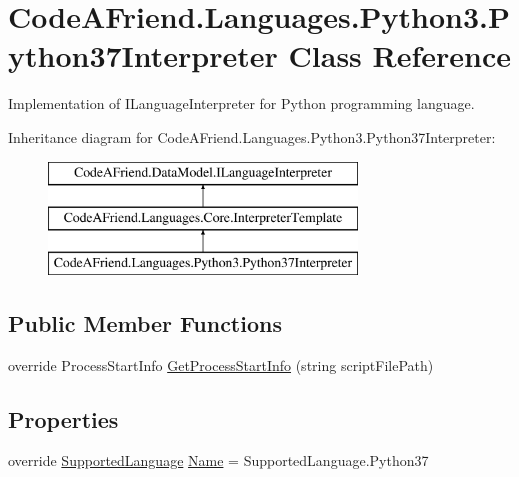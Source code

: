 \hypertarget{class_code_a_friend_1_1_languages_1_1_python3_1_1_python37_interpreter}{}\section{Code\+A\+Friend.\+Languages.\+Python3.\+Python37\+Interpreter Class Reference}
\label{class_code_a_friend_1_1_languages_1_1_python3_1_1_python37_interpreter}


Implementation of I\+Language\+Interpreter for Python programming language.  


Inheritance diagram for Code\+A\+Friend.\+Languages.\+Python3.\+Python37\+Interpreter\+:\begin{figure}[H]
\begin{center}
\leavevmode
\includegraphics[height=3.000000cm]{class_code_a_friend_1_1_languages_1_1_python3_1_1_python37_interpreter}
\end{center}
\end{figure}
\subsection*{Public Member Functions}
\begin{DoxyCompactItemize}
\item 
override Process\+Start\+Info \mbox{\hyperlink{class_code_a_friend_1_1_languages_1_1_python3_1_1_python37_interpreter_a61f777c41849f97cd94eccee5fe7c617}{Get\+Process\+Start\+Info}} (string script\+File\+Path)
\end{DoxyCompactItemize}
\subsection*{Properties}
\begin{DoxyCompactItemize}
\item 
override \mbox{\hyperlink{namespace_code_a_friend_1_1_data_model_a13e088c525db1b03a4de75420ced79b2}{Supported\+Language}} \mbox{\hyperlink{class_code_a_friend_1_1_languages_1_1_python3_1_1_python37_interpreter_a8cb30396a002b58c37ead323fae59383}{Name}} = Supported\+Language.\+Python37
\end{DoxyCompactItemize}


